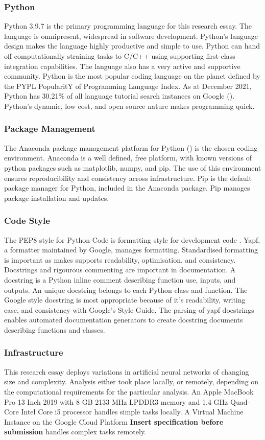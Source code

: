 \documentclass[12pt]{article}
\begin{document}
\subsubsection{Python}\label{python}
Python 3.9.7 is the primary programming language for this research essay. 
The language is omnipresent, widespread in software development. 
Python's language design makes the language highly productive and simple to use. 
Python can hand off computationally straining tasks to C/C++ using supporting first-class integration capabilities.
The language also has a very active and supportive community.
Python is the most popular coding language on the planet defined by the PYPL PopularitY of Programming Language Index. 
As at December 2021, Python has 30.21\% of all language tutorial search instances on Google (\cite{PYPL_Pop}).
 Python's dynamic, low cost, and open source nature makes programming quick.

\subsubsection{Package Management}
The Anaconda package management platform for Python (\cite{Anaconda}) is the chosen coding environment.
Anaconda is a well defined, free platform, with known versions of python packages such as matplotlib, numpy, and pip.
The use of this environment ensures reproducibility and consistency across infrastructure.
Pip is the default package manager for Python, included in the Anaconda package. 
Pip manages package installation and updates.

\subsubsection{Code Style} \label{CS}
The PEP8 style for Python Code is formatting style for development code \cite{PEP8}. 
Yapf, a formatter maintained by Google, manages formatting.
Standardised formatting is important as makes supports readability, optimisation, and consistency.
Docstrings and rigourous commenting are important in documentation. 
A docstring is a Python inline comment describing function use, inputs, and outputs.
An unique docstring belongs to each Python class and function. 
The Google style docstring is most appropriate because of it's readability, writing ease, and consistency with Google's Style Guide.
The parsing of yapf docstrings enables automated documentation generators to create docstring documents describing functions and classes.

\subsubsection{Infrastructure}
This research essay deploys variations in artificial neural networks of changing size and complexity.
Analysis either took place locally, or remotely, depending on the computational requirements for the particular analysis.
An Apple MacBook Pro 13 Inch 2019 with 8 GB 2133 MHz LPDDR3 memory and 1.4 GHz Quad-Core Intel Core i5 processor handles simple tasks locally.
A Virtual Machine Instance on the Google Cloud Platform \textbf{Insert specification before submission} handles complex tasks remotely.
\end{document}
